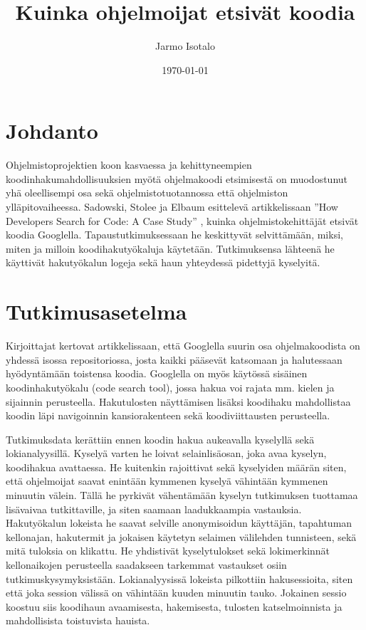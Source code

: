 \documentclass[finnish]{../tktltiki2}
\title{Kuinka ohjelmoijat etsivät koodia}
\author{Jarmo Isotalo}
\date{\today}
\theoremstyle{definition}
\theoremstyle{remark}
\begin{document}

\frontmatter      %

\maketitle        %

\tableofcontents  %


\mainmatter       %

\section{Johdanto}

Ohjelmistoprojektien koon kasvaessa ja kehittyneempien koodinhakumahdollisuuksien myötä ohjelmakoodi etsimisestä on muodostunut yhä oleellisempi osa sekä ohjelmistotuotannossa että ohjelmiston ylläpitovaiheessa. Sadowski, Stolee ja Elbaum esittelevä artikkelissaan ''How Developers Search for Code: A Case Study'' \cite{g_search_code}, kuinka ohjelmistokehittäjät etsivät koodia Googlella. Tapaustutkimuksessaan he keskittyvät selvittämään, miksi, miten ja milloin koodihakutyökaluja käytetään. Tutkimuksensa lähteenä he käyttivät hakutyökalun logeja sekä haun yhteydessä pidettyjä kyselyitä.

\section{Tutkimusasetelma}

Kirjoittajat kertovat artikkelissaan, että Googlella suurin osa ohjelmakoodista on yhdessä isossa repositoriossa, josta kaikki pääsevät katsomaan ja halutessaan hyödyntämään toistensa koodia. Googlella on myös käytössä sisäinen koodinhakutyökalu (code search tool), jossa hakua voi rajata mm. kielen ja sijainnin perusteella. Hakutulosten näyttämisen lisäksi koodihaku mahdollistaa koodin läpi navigoinnin kansiorakenteen sekä koodiviittausten perusteella. %

Tutkimuksdata kerättiin ennen koodin hakua aukeavalla kyselyllä sekä lokianalyysillä. Kyselyä varten he loivat selainlisäosan, joka avaa kyselyn, koodihakua avattaessa. He kuitenkin rajoittivat sekä kyselyiden määrän siten, että ohjelmoijat saavat enintään kymmenen kyselyä vähintään kymmenen minuutin välein. Tällä he pyrkivät vähentämään kyselyn tutkimuksen tuottamaa lisävaivaa tutkittaville, ja siten saamaan laadukkaampia vastauksia.  Hakutyökalun lokeista he saavat selville anonymisoidun käyttäjän, tapahtuman kellonajan, hakutermit ja jokaisen käytetyn selaimen välilehden tunnisteen, sekä mitä tuloksia on klikattu. He yhdistivät kyselytulokset sekä lokimerkinnät kellonaikojen perusteella saadakseen tarkemmat vastaukset osiin tutkimuskysymyksistään. Lokianalyysissä lokeista pilkottiin hakusessioita, siten että joka session välissä on vähintään kuuden minuutin tauko. Jokainen sessio koostuu siis koodihaun avaamisesta, hakemisesta, tulosten katselmoinnista ja mahdollisista toistuvista hauista.
\end{document}
